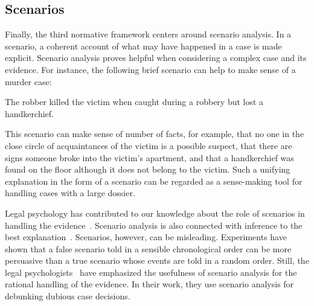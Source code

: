 \documentclass[10pt]{article}
\begin{document}
\subsection{Scenarios}
\label{sec:introScen}
Finally, the third normative framework %
centers around scenario analysis. In a scenario, a coherent account of what may have happened in a case is made explicit. %
Scenario analysis proves helpful when considering a complex case and its evidence. 
For instance, the following brief scenario can help to make sense of a murder case:
%
\begin{description}
	\item The robber killed the victim when caught during a robbery but lost a handkerchief. 	
\end{description}
%
\noindent This scenario can make sense of number of facts, for example, that no one in the close circle of acquaintances 
of the victim is a possible suspect, that there are signs someone broke into the victim's apartment, and that a handkerchief 
was found on the floor although it does not belong to the victim. 
Such a unifying explanation in the form of
a scenario can be regarded as a sense-making tool for handling 
cases with a large dossier. 
%
%



Legal psychology has contributed to our knowledge about the role of scenarios in handling the evidence~\citep{bennettFeldman1981,penningtonHastie1993}. 
Scenario analysis is also connected with inference to the best explanation~\citep{pardoAllen2008}.
Scenarios, however, 
can be misleading. Experiments have shown that a false scenario told in a sensible chronological order can be more persuasive 
than a true scenario whose events are told in a random order. Still, the legal psychologists~\citet{wagenaarEtal1993} have
emphasized the usefulness of scenario analysis for the rational handling of the evidence. In their work, they use scenario analysis for 
debunking dubious case decisions. 
\end{document}
